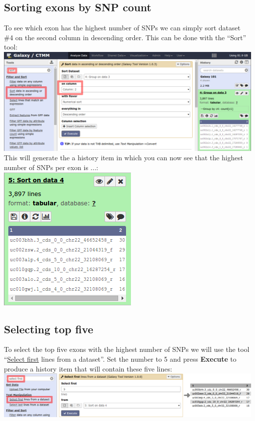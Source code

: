 \documentclass[11pt,a4paper]{article}
\begin{document}
\subsection{Sorting exons by SNP count}
To see which exon has the highest number of SNPs we can simply sort dataset \#4 on the second column in descending order. This can be done with the ``Sort'' tool:\\
\includegraphics[scale=0.65]{figures/101_15}\\
This will generate the a history item in which you can now see that the highest number of SNPs per exon is ...:\\
\includegraphics[scale=0.65]{figures/101_16}\\
\subsection{Selecting top five}
To select the top five exons with the highest number of SNPs we will use the tool ``\underline{Select first} lines from a dataset''. Set the number to 5 and press \textbf{Execute} to produce a history item that will contain these five lines:\\
\includegraphics[width=\textwidth]{figures/101_17}\\
\end{document}
